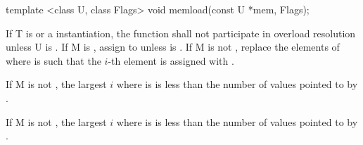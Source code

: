 \begin{itemdescr}
\begin{itemdecl}
template <class U, class Flags> void memload(const U *mem, Flags);
\end{itemdecl}
\begin{itemdescr}
  \pnum\remarks If \type T is \bool or a \mask instantiation, the function shall not participate in overload resolution unless \type U is \bool.
  \pnum\effects If \type M is \bool, assign  to  unless  is \false.
  If \type M is not \bool, replace the elements of  where  is \true such that the $i$-th element is assigned with  \foralli[M::].

  \pnum\requires If \type M is not \bool, the largest $i$ where  is \true is less than the number of values pointed to by .
\end{itemdescr}

  \pnum\requires If \type M is not \bool, the largest $i$ where  is \true is less than the number of values pointed to by .
\end{itemdescr}

